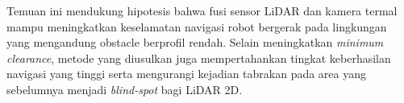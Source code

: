 Temuan ini mendukung hipotesis bahwa fusi sensor LiDAR dan kamera termal mampu meningkatkan keselamatan navigasi robot bergerak pada lingkungan yang mengandung obstacle berprofil rendah. Selain meningkatkan \textit{minimum clearance}, metode yang diusulkan juga mempertahankan tingkat keberhasilan navigasi yang tinggi serta mengurangi kejadian tabrakan pada area yang sebelumnya menjadi \textit{blind-spot} bagi LiDAR 2D.
